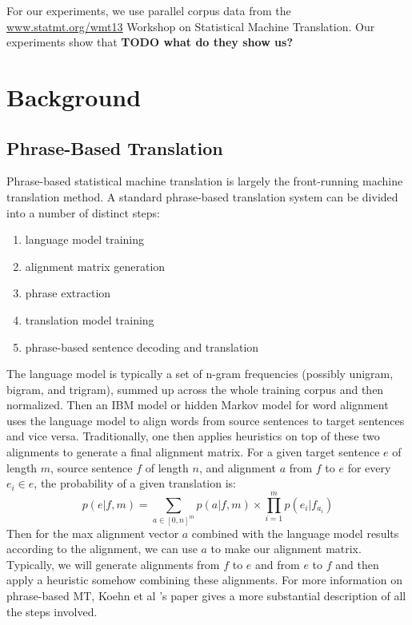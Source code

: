 \documentclass[twocolumn]{article}
\newcommand{\linespacing}{
  \onehalfspacing
}
\newcommand{\wrapSingleSpacing}[1]{
  \singlespacing
  #1
  \linespacing{}
}
\begin{document}
For our experiments, we use parallel corpus data from the
\href{http://www.statmt.org/wmt13/training-parallel-nc-v8.tgz}
     {\underline{www.statmt.org/wmt13}}
Workshop on Statistical Machine Translation.
Our experiments show that \textbf{TODO what do they show us?}


\section{Background}
\subsection{Phrase-Based Translation}
Phrase-based statistical machine translation is largely the front-running
machine translation method. A standard phrase-based translation system can be
divided into a number of distinct steps:
\wrapSingleSpacing{
\begin{enumerate}
    \item language model training
    \item alignment matrix generation
    \item phrase extraction
    \item translation model training
    \item phrase-based sentence decoding and translation
\end{enumerate}
}
The language model is typically a set of n-gram frequencies (possibly unigram,
bigram, and trigram), summed up across the whole training corpus and then
normalized. Then an IBM model or hidden Markov model for word alignment uses the
language model to align words from source sentences to target sentences and vice
versa. Traditionally, one then applies heuristics on top of these two alignments
to generate a final alignment matrix.
For a given target sentence $e$ of length $m$, source sentence $f$ of length
$n$, and alignment $a$ from $f$ to $e$ for every $e_i \in e$, the probability of
a given translation is:
\[
  p(e | f, m) = \sum_{a \in [0, n]^m} p(a | f,m)
    \times \prod_{i=1}^m p(e_i | f_{a_i})
\]
Then for the max alignment vector $a$ combined with the language model results
according to the alignment, we can use $a$ to make our alignment
matrix. Typically, we will generate alignments from $f$ to $e$ and from $e$ to
$f$ and then apply a heuristic somehow combining these alignments.
For more information on phrase-based MT, Koehn et al \cite{kom2003}'s paper
gives a more substantial description of all the steps involved.
\end{document}
